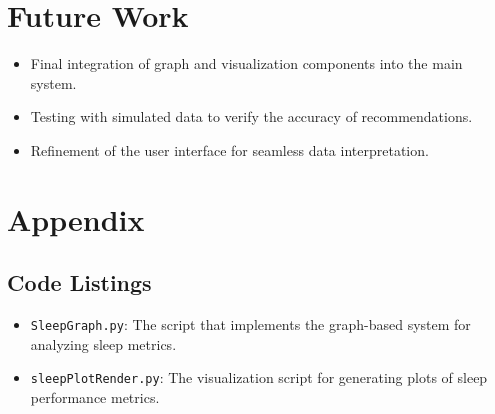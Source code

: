 \documentclass{article}
\begin{document}
\section{Future Work}
\begin{itemize}
    \item Final integration of graph and visualization components into the main system.
    \item Testing with simulated data to verify the accuracy of recommendations.
    \item Refinement of the user interface for seamless data interpretation.
\end{itemize}

\section{Appendix}
\subsection{Code Listings}
\begin{itemize}
    \item \texttt{SleepGraph.py}: The script that implements the graph-based system for analyzing sleep metrics.
    \item \texttt{sleepPlotRender.py}: The visualization script for generating plots of sleep performance metrics.
\end{itemize}
\end{document}

